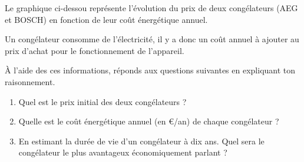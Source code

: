%
%
    Le graphique ci-dessou représente l'évolution du prix de deux congélateurs (AEG et BOSCH) en fonction de leur coût énergétique annuel.

    Un congélateur consomme de l'électricité, il y a donc un coût annuel à ajouter au prix d'achat pour le fonctionnement de l'appareil.

    À l'aide des ces informations, réponds aux questions suivantes en expliquant ton raisonnement.
    \begin{enumerate}
        \item Quel est le prix initial des deux congélateurs ?
        \item Quelle est le coût énergétique annuel (en €/an) de chaque congélateur ?
        \item En estimant la durée de vie d'un congélateur à dix ans. Quel sera le congélateur le plus avantageux économiquement parlant ?
    \end{enumerate}
    \begin{center}
        
    \end{center}
